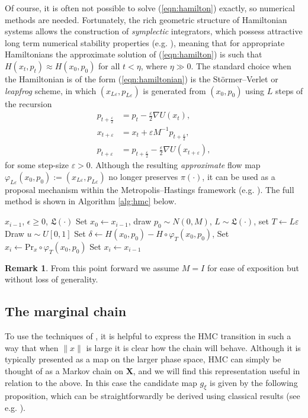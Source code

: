 \documentclass[bj,numbers,noshowframe]{imsart}
\newcommand{\X}{\mathbf{X}}
\newcommand{\e}{\varepsilon}
\theoremstyle{definition}
\theoremstyle{plain}
\theoremstyle{definition}
\newtheorem{rem}[defn]{Remark}
\begin{document}
Of course, it is often not possible to solve (\ref{eqn:hamilton}) exactly, so numerical methods are needed.  Fortunately, the rich geometric structure of Hamiltonian systems allows the construction of \emph{symplectic} integrators, which possess attractive long term numerical stability properties (e.g. \citep{leimkuhler2004simulating}), meaning that for appropriate Hamiltonians the approximate solution of (\ref{eqn:hamilton}) is such that $H(x_t,p_t) \approx H(x_0,p_0)$ for all $t<\eta$, where $\eta \gg 0$.  The standard choice when the Hamiltonian is of the form (\ref{eqn:hamiltonian}) is the St\"{o}rmer--Verlet or \emph{leapfrog} scheme, in which $(x_{L\e},p_{L\e})$ is generated from $(x_0,p_0)$ using $L$ steps of the recursion
\begin{align*}
p_{t+\frac{\e}{2}} &= p_t - \frac{\e}{2}\nabla U(x_t), \\
x_{t+\e} &= x_t + \e M^{-1}p_{t+\frac{\e}{2}}, \\
p_{t+\e} &= p_{t+\frac{\e}{2}} - \frac{\e}{2}\nabla U(x_{t+\e}),
\end{align*}
for some step-size $\e>0$.  Although the resulting \emph{approximate} flow map $\varphi_{L\e}(x_0,p_0) := (x_{L\e},p_{L\e})$ no longer preserves $\pi(\cdot)$, it can be used as a proposal mechanism within the Metropolis--Hastings framework (e.g. \citep{neal2011mcmc}).  The full method is shown in Algorithm \ref{alg:hmc} below.

\begin{algorithm}[ht] 
\caption{Hamiltonian Monte Carlo, single iteration.}
\begin{algorithmic}
\label{alg:hmc}
\REQUIRE $x_{i-1}$, $\epsilon \geq 0$, $\mathfrak{L}(\cdot)$
\STATE Set $x_0 \leftarrow x_{i-1}$, draw $p_0 \sim N(0,M)$, $L \sim \mathfrak{L}(\cdot)$, set $T \leftarrow L\varepsilon$
\STATE Draw $u \sim U[0,1]$
\STATE Set $\delta \leftarrow H(x_0,p_0) - H\circ \varphi_T(x_0,p_0)$,
\STATE Set $x_i \leftarrow \text{Pr}_x \circ \varphi_T(x_0,p_0)$
\ELSE
\STATE Set $x_i \leftarrow x_{i-1}$
\ENDIF
\end{algorithmic}
\end{algorithm}

\begin{rem}
From this point forward we assume $M = I$ for ease of exposition but without loss of generality.
\end{rem}

\subsection{The marginal chain} 
To use the techniques of \citep{meyn2012markov}, it is helpful to express the HMC transition in such a way that when $\|x\|$ is large it is clear how the chain will behave.  Although it is typically presented as a map on the larger phase space, HMC can simply be thought of as a Markov chain on $\X$, and we will find this representation useful in relation to the above.  In this case the candidate map $g_\xi$ is given by the following proposition, which can be straightforwardly be derived using classical results (see e.g. \citep{bou2018geometric}).
\end{document}
